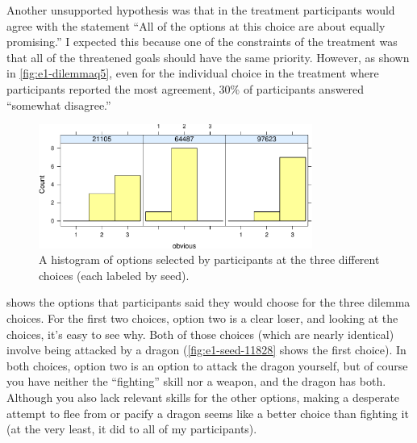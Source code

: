 Another unsupported hypothesis was that in the \dlm{} treatment participants would agree with the statement ``All of the options at this choice are about equally promising.''
%
I expected this because one of the constraints of the \dlm{} treatment was that all of the threatened goals should have the same priority.
%
However, as shown in \cref{fig:e1-dilemmaq5}, even for the individual choice in the \dlm{} treatment where participants reported the most agreement, 30\% of participants answered ``somewhat disagree.'' 


\begin{figure}[!b]
  \centering
  \includegraphics[width=0.8\textwidth,page=3]{fig/choices-cropped.pdf}
  \caption[Histogram of option preferences for ``dilemma'' choices]{A histogram of options selected by participants at the three different \dlm{} choices (each labeled by seed).}
  \label{fig:e1-dilchoices}
\end{figure}


 shows the options that participants said they would choose for the three dilemma choices.
%
For the first two choices, option two is a clear loser, and looking at the choices, it's easy to see why.
%
Both of those choices (which are nearly identical) involve being attacked by a dragon (\cref{fig:e1-seed-11828} shows the first choice).
%
In both choices, option two is an option to attack the dragon yourself, but of course you have neither the ``fighting'' skill nor a weapon, and the dragon has both.
%
Although you also lack relevant skills for the other options, making a desperate attempt to flee from or pacify a dragon seems like a better choice than fighting it (at the very least, it did to all of my participants).

